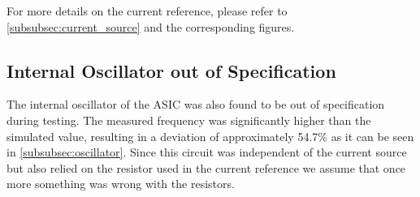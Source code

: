 For more details on the current reference, please refer to \autoref{subsubsec:current_source} and the corresponding figures.

\subsection{Internal Oscillator out of Specification}
The internal oscillator of the \ac{ASIC} was also found to be out of specification during testing. The measured frequency was significantly higher than the simulated value, resulting in a deviation of approximately 54.7\% as it can be seen in \autoref{subsubsec:oscillator}. Since this circuit was independent of the current source but also relied on the resistor used in the current reference we assume that once more something was wrong with the resistors.
